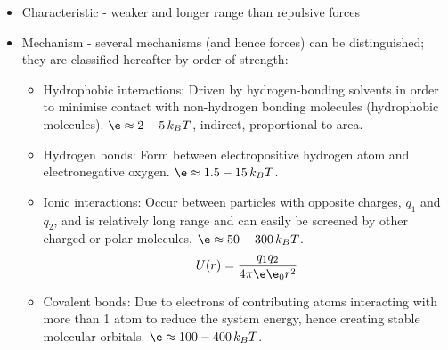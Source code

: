 \documentclass[a4paper, 11pt, normalem]{report}
\begin{document}
\begin{itemize}
      \item Characteristic - weaker and longer range than repulsive forces
      \item Mechanism - several mechanisms (and hence forces) can be distinguished; they are classified hereafter by order of strength:
        \begin{itemize}
            \item Hydrophobic interactions: Driven by hydrogen-bonding solvents in order to minimise contact with non-hydrogen bonding molecules (hydrophobic molecules).
                $\e \approx 2-5\,k_BT$, indirect, proportional to area.
            \item Hydrogen bonds: Form between electropositive hydrogen atom and electronegative oxygen.
                $\e \approx 1.5-15\,k_BT$.
            \item Ionic interactions: Occur between particles with opposite charges, $q_1$ and $q_2$, and is relatively long range and can easily be screened by other charged or polar molecules.
                $\e \approx 50-300\,k_BT$.
                \begin{equation}
                    U(r) = \frac{q_1q_2}{4\pi\e\e_0 r^2}
                \end{equation}
            \item Covalent bonds: Due to electrons of contributing atoms interacting with more than 1 atom to reduce the system energy, hence creating stable molecular orbitals.
                $\e \approx 100-400\,k_BT$.
        \end{itemize}
\end{itemize}
\end{document}
